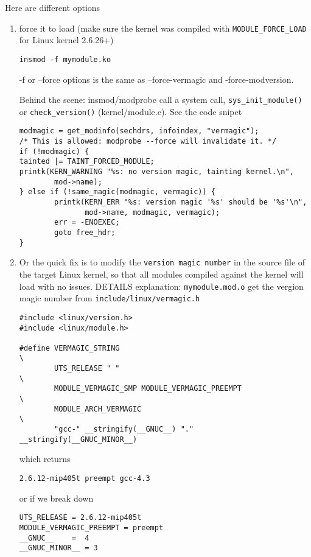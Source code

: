 Here are different options
\begin{enumerate}
  \item force it to load (make sure the kernel was compiled with
  \verb!MODULE_FORCE_LOAD! for Linux kernel 2.6.26+)
   
\begin{verbatim}
insmod -f mymodule.ko
\end{verbatim}
-f or --force options is the same as --force-vermagic
and -force-modversion.

Behind the scene: insmod/modprobe call a system call,
\verb!sys_init_module()! or \verb!check_version()! (kernel/module.c). See the
code snipet
\begin{verbatim}
modmagic = get_modinfo(sechdrs, infoindex, "vermagic");
/* This is allowed: modprobe --force will invalidate it. */
if (!modmagic) {
tainted |= TAINT_FORCED_MODULE;
printk(KERN_WARNING "%s: no version magic, tainting kernel.\n",
        mod->name);
} else if (!same_magic(modmagic, vermagic)) {
        printk(KERN_ERR "%s: version magic '%s' should be '%s'\n",
               mod->name, modmagic, vermagic);
        err = -ENOEXEC;
        goto free_hdr;
}
\end{verbatim}

  \item 
  Or the quick fix is to modify the \verb!version magic number! in the source file
of the target Linux kernel, so that all modules compiled against the kernel will
load with no issues.
DETAILS explanation: \verb!mymodule.mod.o! get the vergion magic number from
\verb!include/linux/vermagic.h! 
\begin{verbatim}
#include <linux/version.h>
#include <linux/module.h>

#define VERMAGIC_STRING                                                 \
        UTS_RELEASE " "                                                 \
        MODULE_VERMAGIC_SMP MODULE_VERMAGIC_PREEMPT                     \
        MODULE_ARCH_VERMAGIC                                            \
        "gcc-" __stringify(__GNUC__) "." __stringify(__GNUC_MINOR__)                                                                            
\end{verbatim}
which returns 
\begin{verbatim}
2.6.12-mip405t preempt gcc-4.3
\end{verbatim}
or if we break down
\begin{verbatim}
UTS_RELEASE = 2.6.12-mip405t
MODULE_VERMAGIC_PREEMPT = preempt
__GNUC__    =  4
__GNUC_MINOR__ = 3
\end{verbatim}


\end{enumerate}
